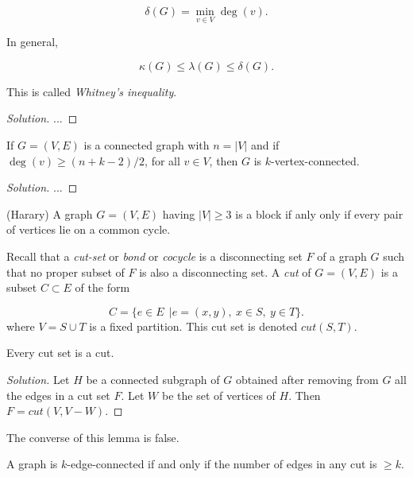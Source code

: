 \[
\delta(G) = \min_{v\in V} \deg(v).
\]

\begin{proposition}
{\rm
In general,

\[
\kappa(G)\leq \lambda(G)\leq \delta(G).
\]
}
\end{proposition}

This is called {\it Whitney's inequality}.

\begin{proof}[Solution]

...

\end{proof}

\begin{theorem}
{\rm
If $G=(V,E)$ is a connected graph with $n=|V|$ and if
$\deg(v)\geq (n+k-2)/2$, for all $v\in V$, then 
$G$ is $k$-vertex-connected.
}
\end{theorem}

\begin{proof}[Solution]

...

\end{proof}


\begin{corollary} (Harary)
{\rm
A graph $G=(V,E)$ having $|V|\geq 3$ is a block if anly only if
every pair of vertices lie on a common 
cycle.
}
\end{corollary}


Recall that a {\it cut-set} or {\it bond}
or {\it cocycle} is a disconnecting set $F$ of a graph $G$ such that
no proper subset of $F$ is also a disconnecting set.
A {\it cut} of $G=(V,E)$ is a subset $C\subset E$ of the form

\[
C=\{e\in E\ \ | e=(x,y), \ x\in S,\ y\in T\}.
\]
where $V=S\cup T$ is a fixed partition.
This cut set is denoted $cut(S,T)$.

\begin{lemma}
{\rm
Every cut set is a cut.
}
\end{lemma}

\begin{proof}[Solution]
Let $H$ be a connected subgraph of $G$ obtained after removing from
$G$ all the edges in a cut set $F$. Let $W$ be the set of vertices
of $H$. Then $F=cut(V,V-W)$.
\end{proof}

The converse of this lemma is false.

\begin{theorem}
{\rm
A graph is $k$-edge-connected if and only if the number of
edges in any cut is $\geq k$.
}
\end{theorem}

